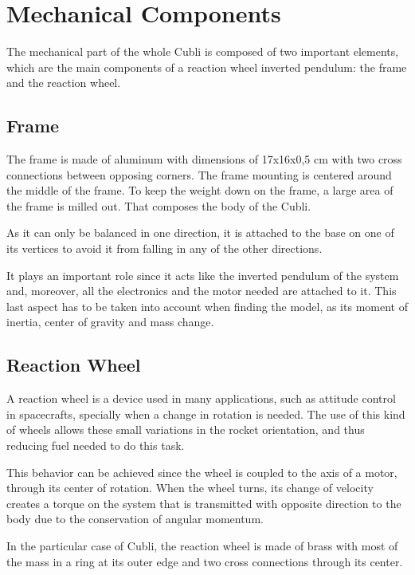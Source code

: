 \section{Mechanical Components}
The mechanical part of the whole Cubli is composed of two important elements, which are the main components of a reaction wheel inverted pendulum: the frame and the reaction wheel.

\subsection{Frame}
The frame is made of aluminum with dimensions of 17x16x0,5 cm  with two cross connections between opposing corners. The frame mounting is centered around the middle of the frame.
To keep the weight down on the frame, a large area of the frame is milled out. That composes the body of the Cubli. 

As it can only be balanced in one direction, it is attached to the base on one of its vertices to avoid it from falling in any of the other directions.

It plays an important role since it acts like the inverted pendulum of the system and, moreover, all the electronics and the motor needed are attached to it. This last aspect has to be taken into account when finding the model, as its moment of inertia, center of gravity and mass change.

\subsection{Reaction Wheel}
A reaction wheel is a device used in many applications, such as attitude control in spacecrafts, specially when a change in rotation is needed. The use of this kind of wheels allows these small variations in the rocket orientation, and thus reducing fuel needed to do this task.

This behavior can be achieved since the wheel is coupled to the axis of a motor, through its center of rotation. When the wheel turns, its change of velocity creates a torque on the system that is transmitted with opposite direction to the body due to the conservation of angular momentum.

In the particular case of Cubli, the reaction wheel is made of brass with most of the mass in a ring at its outer edge and two cross connections through its center.
